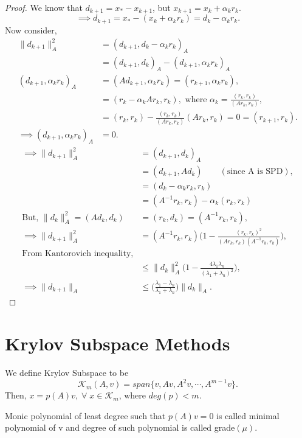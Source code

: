 \documentclass[10pt,a4paper]{article}
\begin{document}
\begin{proof}
We know that $d_{k+1}=x_*-x_{k+1}$, but $x_{k+1}=x_k+\alpha_k r_k.$
$$\implies d_{k+1}=x_*-(x_k+\alpha_k r_k)=d_k-\alpha_k r_k.$$
Now consider,
\begin{align*}
\|d_{k+1}\|^2_A &= (d_{k+1},d_k-\alpha_k r_k)_A \\
&= (d_{k+1},d_k)_A-(d_{k+1},\alpha_k r_k)_A \\
(d_{k+1},\alpha_k r_k)_A &= (Ad_{k+1},\alpha_k r_k) = (r_{k+1},\alpha_k r_k), \\
&= (r_k-\alpha_kAr_k,r_k),\text{ where }\alpha_k=\frac{(r_k,r_k)}{(Ar_k,r_k)}, \\
&= (r_k,r_k)-\frac{(r_k,r_k)}{(Ar_k,r_k)}(Ar_k,r_k) = 0 = (r_{k+1},r_k). \\
\implies (d_{k+1},\alpha_k r_k)_A &= 0.
\end{align*}
\begin{align*}
\implies \|d_{k+1}\|^2_A &= (d_{k+1},d_k)_A \\
&= (d_{k+1},Ad_k) \qquad(\text{since A is SPD}),\\
&= (d_k-\alpha_k r_k,r_k) \\
&= (A^{-1}r_k,r_k)-\alpha_k(r_k,r_k) \\
\text{But, }\|d_k\|^2_A = (Ad_k,d_k) &= (r_k,d_k) = (A^{-1}r_k,r_k), \\
\implies \|d_{k+1}\|^2_A &= (A^{-1}r_k,r_k)\Big(1-\frac{(r_k,r_k)^2}{(Ar_k,r_k)(A^{-1}r_k,r_k)}\Big), \\
\text{From Kantorovich inequality,} \\
&\le \|d_{k}\|^2_A\Big(1-\frac{4\lambda_1\lambda_n}{(\lambda_1+\lambda_n)^2}\Big), \\
\implies \|d_{k+1}\|_A&\le\Big(\frac{\lambda_1-\lambda_n}{\lambda_1+\lambda_n}\Big)\|d_k\|_A.
\end{align*}
\end{proof}

\section{Krylov Subspace Methods}

We define Krylov Subspace to be 
$$\mathcal{K}_m(A,v)=span\{v,Av,A^2v,\cdots,A^{m-1}v\}.$$
Then, $x=p(A)v,\;\forall\;x\in\mathcal{K}_m\text{, where }deg(p)<m.$

\begin{mydef}
Monic polynomial of least degree such that $p(A)v=0$ is called minimal polynomial of v and degree of such polynomial is called grade$(\mu)$.
\end{mydef}
\end{document}
